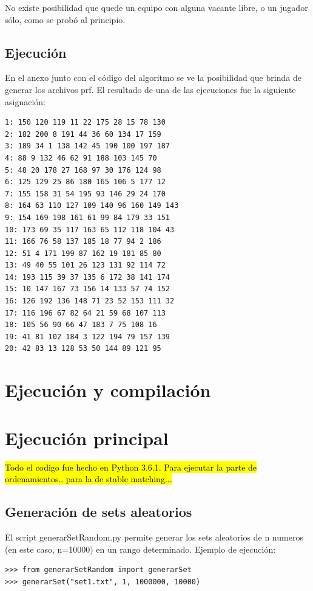 \documentclass[article,a4paper]{article}
\begin{document}
No existe posibilidad que quede un equipo con alguna vacante libre, o un jugador sólo, como se probó al principio.

\subsection{Ejecución}
En el anexo junto con el código del algoritmo se ve la posibilidad que brinda de generar los archivos prf. El resultado de una de las ejecuciones fue la siguiente asignación: 

\begin{verbatim}
1: 150 120 119 11 22 175 28 15 78 130
2: 182 200 8 191 44 36 60 134 17 159
3: 189 34 1 138 142 45 190 100 197 187
4: 88 9 132 46 62 91 188 103 145 70
5: 48 20 178 27 168 97 30 176 124 98
6: 125 129 25 86 180 165 106 5 177 12
7: 155 158 31 54 195 93 146 29 24 170
8: 164 63 110 127 109 140 96 160 149 143
9: 154 169 198 161 61 99 84 179 33 151
10: 173 69 35 117 163 65 112 118 104 43
11: 166 76 58 137 185 18 77 94 2 186
12: 51 4 171 199 87 162 19 181 85 80
13: 49 40 55 101 26 123 131 92 114 72
14: 193 115 39 37 135 6 172 38 141 174
15: 10 147 167 73 156 14 133 57 74 152
16: 126 192 136 148 71 23 52 153 111 32
17: 116 196 67 82 64 21 59 68 107 113
18: 105 56 90 66 47 183 7 75 108 16
19: 41 81 102 184 3 122 194 79 157 139
20: 42 83 13 128 53 50 144 89 121 95
\end{verbatim}



\appendix
\section{Ejecución y compilación}

\section{Ejecución principal}

\hl{Todo el codigo fue hecho en Python 3.6.1. Para ejecutar la parte de ordenamientos.. para la de stable matching...}

\subsection{Generación de sets aleatorios}

El script generarSetRandom.py permite generar los sets aleatorios de n numeros (en este caso, n=10000) en un rango determinado. Ejemplo de ejecución:

\begin{verbatim}
>>> from generarSetRandom import generarSet
>>> generarSet("set1.txt", 1, 1000000, 10000)
\end{verbatim}
\end{document}

